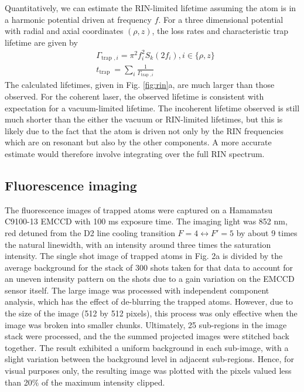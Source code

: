 Quantitatively, we can estimate the RIN-limited lifetime assuming the atom is in a harmonic potential driven at frequency $f$. For a three dimensional potential with radial and axial coordinates $(\rho, z)$, the loss rates and characteristic trap lifetime are given by
\begin{equation}
    \begin{aligned}
    & \Gamma_{\text {trap }, i}=\pi^2 f_i^2 S_k\left(2 f_i\right), i \in\{\rho, z\} \\
    & t_{\text {trap }}=\sum_i \frac{1}{\Gamma_{\text {trap }, i}}
    \end{aligned}
\end{equation}
The calculated lifetimes, given in Fig. \ref{fig:rin}a, are much larger than those observed. For the coherent laser, the observed lifetime is consistent with expectation for a vacuum-limited lifetime. The incoherent lifetime observed is still much shorter than the either the vacuum or RIN-limited lifetimes, but this is likely due to the fact that the atom is driven not only by the RIN frequencies which are on resonant but also by the other components. A more accurate estimate would therefore involve integrating over the full RIN spectrum.

\subsection{Fluorescence imaging}\label{sub:imaging}
The fluorescence images of trapped atoms were captured on a  Hamamatsu C9100-13 EMCCD with 100 ms exposure time. The imaging light was 852 nm, red detuned from the D2 line cooling transition $F=4 \leftrightarrow F'=5$ by about 9 times the natural linewidth, with an intensity around three times the saturation intensity. The single shot image of trapped atoms in Fig. 2a is divided by the average background for the stack of 300 shots taken for that data to account for an uneven intensity pattern on the shots due to a gain variation on the EMCCD sensor itself. The large image was processed with independent component analysis, which has the effect of de-blurring the trapped atoms. However, due to the size of the image (512 by 512 pixels), this process was only effective when the image was broken into smaller chunks. Ultimately, 25 sub-regions in the image stack were processed, and the the summed projected images were stitched back together. The result exhibited a uniform background in each sub-image, with a slight variation between the background level in adjacent sub-regions. Hence, for visual purposes only, the resulting image was plotted with the pixels valued less than 20$\%$ of the maximum intensity clipped.


